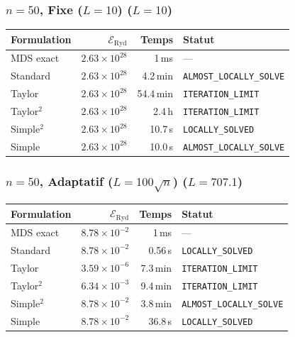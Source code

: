 \subsubsection{$n=50$, Fixe ($L{=}10$) ($L=10$)}
\begin{longtable}{@{}lrrl@{}}
  \toprule
  Formulation & $\mathcal{E}_{\mathrm{Ryd}}$ & Temps & Statut \\
  \midrule
  \endhead
  MDS exact & $2.63\times10^{28}$ & 1\,ms & --- \\
  Standard & $2.63\times10^{28}$ & 4.2\,min & \texttt{ALMOST\_LOCALLY\_SOLVE} \\
  Taylor & $2.63\times10^{28}$ & 54.4\,min & \texttt{ITERATION\_LIMIT} \\
  Taylor$^2$ & $2.63\times10^{28}$ & 2.4\,h & \texttt{ITERATION\_LIMIT} \\
  Simple$^2$ & $2.63\times10^{28}$ & 10.7\,s & \texttt{LOCALLY\_SOLVED} \\
  Simple & $2.63\times10^{28}$ & 10.0\,s & \texttt{ALMOST\_LOCALLY\_SOLVE} \\
  \bottomrule
\end{longtable}

\subsubsection{$n=50$, Adaptatif ($L{=}100\sqrt{n}$) ($L=707.1$)}
\begin{longtable}{@{}lrrl@{}}
  \toprule
  Formulation & $\mathcal{E}_{\mathrm{Ryd}}$ & Temps & Statut \\
  \midrule
  \endhead
  MDS exact & $8.78\times10^{-2}$ & 1\,ms & --- \\
  Standard & $8.78\times10^{-2}$ & 0.56\,s & \texttt{LOCALLY\_SOLVED} \\
  Taylor & $3.59\times10^{-6}$ & 7.3\,min & \texttt{ITERATION\_LIMIT} \\
  Taylor$^2$ & $6.34\times10^{-3}$ & 9.4\,min & \texttt{ITERATION\_LIMIT} \\
  Simple$^2$ & $8.78\times10^{-2}$ & 3.8\,min & \texttt{ALMOST\_LOCALLY\_SOLVE} \\
  Simple & $8.78\times10^{-2}$ & 36.8\,s & \texttt{LOCALLY\_SOLVED} \\
  \bottomrule
\end{longtable}

